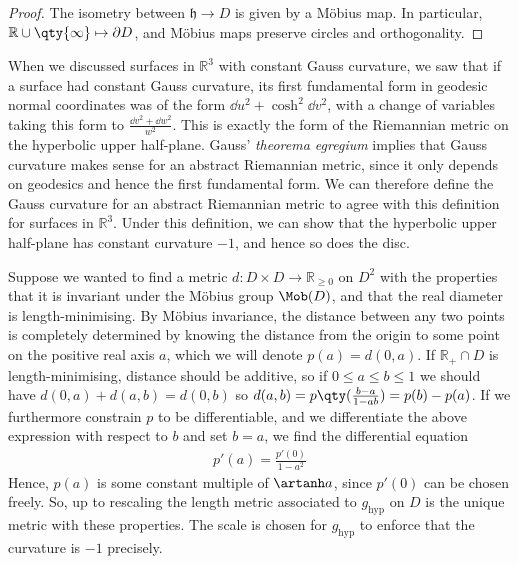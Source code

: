 \begin{proof}
	The isometry between $\mathfrak{h} \to D$ is given by a M\"obius map.
	In particular, $\mathbb R \cup \qty{\infty} \mapsto \partial D$, and M\"obius maps preserve circles and orthogonality.
\end{proof}
\begin{remark}
	When we discussed surfaces in $\mathbb R^3$ with constant Gauss curvature, we saw that if a surface had constant Gauss curvature, its first fundamental form in geodesic normal coordinates was of the form $\dd{u}^2 + \cosh^2 \dd{v}^2$, with a change of variables taking this form to $\frac{\dd{v}^2 + \dd{w}^2}{w^2}$.
	This is exactly the form of the Riemannian metric on the hyperbolic upper half-plane.
	Gauss' \textit{theorema egregium} implies that Gauss curvature makes sense for an abstract Riemannian metric, since it only depends on geodesics and hence the first fundamental form.
	We can therefore define the Gauss curvature for an abstract Riemannian metric to agree with this definition for surfaces in $\mathbb R^3$.
	Under this definition, we can show that the hyperbolic upper half-plane has constant curvature $-1$, and hence so does the disc.

	Suppose we wanted to find a metric $d \colon D \times D \to \mathbb R_{\geq 0}$ on $D^2$ with the properties that it is invariant under the M\"obius group $\Mob(D)$, and that the real diameter is length-minimising.
	By M\"obius invariance, the distance between any two points is completely determined by knowing the distance from the origin to some point on the positive real axis $a$, which we will denote $p(a) = d(0,a)$.
	If $\mathbb R_+ \cap D$ is length-minimising, distance should be additive, so if $0 \leq a \leq b \leq 1$ we should have $d(0,a) + d(a,b) = d(0,b)$ so $d(a,b) = p\qty(\frac{b-a}{1-ab}) = p(b) - p(a)$.
	If we furthermore constrain $p$ to be differentiable, and we differentiate the above expression with respect to $b$ and set $b = a$, we find the differential equation
	\begin{align*}
		p'(a) = \frac{p'(0)}{1-a^2}
	\end{align*}
	Hence, $p(a)$ is some constant multiple of $\artanh a$, since $p'(0)$ can be chosen freely.
	So, up to rescaling the length metric associated to $g_{\text{hyp}}$ on $D$ is the unique metric with these properties.
	The scale is chosen for $g_{\text{hyp}}$ to enforce that the curvature is $-1$ precisely.
\end{remark}

